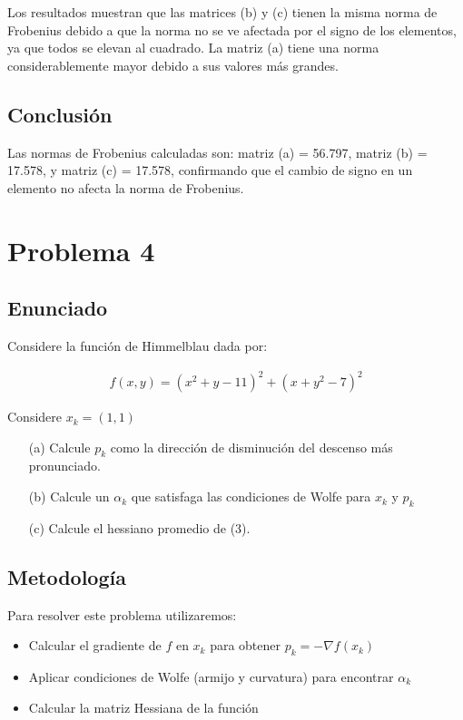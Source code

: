 \documentclass{article}
\begin{document}
Los resultados muestran que las matrices (b) y (c) tienen la misma norma de Frobenius debido a que la norma no se ve afectada por el signo de los elementos, ya que todos se elevan al cuadrado. La matriz (a) tiene una norma considerablemente mayor debido a sus valores más grandes.

\subsection{Conclusión}

Las normas de Frobenius calculadas son: matriz (a) = 56.797, matriz (b) = 17.578, y matriz (c) = 17.578, confirmando que el cambio de signo en un elemento no afecta la norma de Frobenius.

\section{Problema 4}

\subsection{Enunciado}

Considere la función de Himmelblau dada por:

\begin{align} \tag{3}
    f(x,y) = (x^2+y-11)^2+(x+y^2-7)^2
\end{align}

Considere $x_k = (1,1)$

\begin{itemize}
    \item[(a)] Calcule $p_k$ como la dirección de disminución del descenso más pronunciado.
    \item[(b)] Calcule un $\alpha_k$ que satisfaga las condiciones de Wolfe para $x_k$ y $p_k$
    \item[(c)] Calcule el hessiano promedio de (3).
\end{itemize}

\subsection{Metodología}

Para resolver este problema utilizaremos:

\begin{itemize}
    \item Calcular el gradiente de $f$ en $x_k$ para obtener $p_k = -\nabla f(x_k)$
    \item Aplicar condiciones de Wolfe (armijo y curvatura) para encontrar $\alpha_k$
    \item Calcular la matriz Hessiana de la función
\end{itemize}
\end{document}
